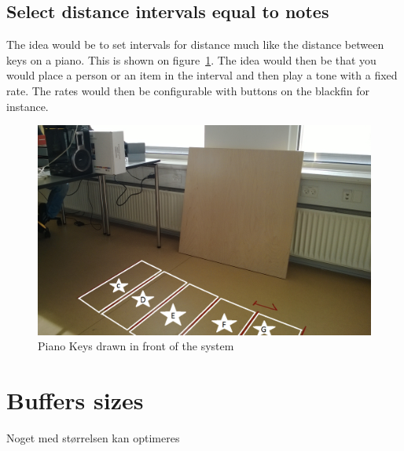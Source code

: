 \subsection{Select distance intervals equal to notes}
The idea would be to set intervals for distance much like the distance between keys on a piano. This is shown on figure~\ref{fig:pianokeys}. The idea would then be that you would place a person or an item in the interval and then play a tone with a fixed rate. The rates would then be configurable with buttons on the blackfin for instance.
\begin{figure}[hbpt]
\centering
\includegraphics[scale=0.3]{billeder/pianokeyground}
\caption{Piano Keys drawn in front of the system}
\label{fig:pianokeys}
\end{figure}
\section{Buffers sizes}
Noget med størrelsen kan optimeres